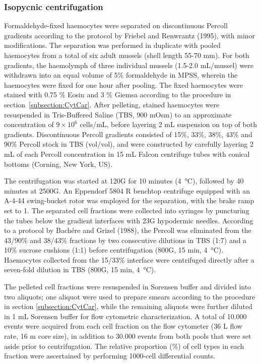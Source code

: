 \subsubsection{Isopycnic centrifugation}
Formaldehyde-fixed haemocytes were separated on discontinuous Percoll gradients according to the protocol by Friebel and Renwrantz (1995), with minor modifications. The separation was performed in duplicate with pooled haemocytes from a total of six adult mussels (shell length 55-70 mm). For both gradients, the haemolymph of three individual mussels (1.5-2.0 mL/mussel) were withdrawn into an equal volume of 5\% formaldehyde in MPSS, wherein the haemocytes were fixed for one hour after pooling. The fixed haemocytes were stained with 0.75 \% Eosin and 3 \% Giemsa according to the procedure in section~\ref{subsection:CytCar}. After pelleting, stained haemocytes were resuspended in Tris-Buffered Saline (TBS, 900 mOsm) to an approximate concentration of $9\times10^{6}$ cells/mL, before layering 2 mL suspension on top of both gradients. Discontinuous Percoll gradients consisted of 15\%, 33\%, 38\%, 43\% and 90\% Percoll stock in TBS (vol/vol), and were constructed by carefully layering 2 mL of each Percoll concentration in 15 mL Falcon centrifuge tubes with conical bottoms (Corning, New York, US).

The centrifugation was started at 120G for 10 minutes (\SI{4}{\celsius}), followed by 40 minutes at 2500G. An Eppendorf 5804 R benchtop centrifuge equipped with an A-4-44 swing-bucket rotor was employed for the separation, with the brake ramp set to 1. The separated cell fractions were collected into syringes by puncturing the tubes below the gradient interfaces with 23G hypodermic needles. According to a protocol by Bachére and Grizel (1988), the Percoll was eliminated from the 43/90\% and 38/43\% fractions by two consecutive dilutions in TBS (1:7) and a 10\% sucrose cushions (1:1) before centrifugation (800G, 15 min, \SI{4}{\celsius}). Haemocytes collected from the 15/33\% interface were centrifuged directly after a seven-fold dilution in TBS (800G, 15 min, \SI{4}{\celsius}).

The pelleted cell fractions were resuspended in Sorensen buffer and divided into two aliquots; one aliquot were used to prepare smears according to the procedure in section \ref{subsection:CytCar}, while the remaining aliquots were further diluted in 1 mL Sorensen buffer for flow cytometric characterization. A total of 10.000 events were acquired from each cell fraction on the flow cytometer (36 \micro L flow rate, 16 \micro m core size), in addition to 30.000 events from both pools that were set aside prior to centrifugation. The relative proportion (\%) of cell types in each fraction were ascertained by performing 1000-cell differential counts.

